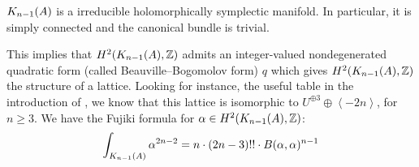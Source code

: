 \begin{theorem}\cite[Th\'eor\`eme 4]{Beauville}
$\kum{A}{n-1}$ is a irreducible holomorphically symplectic manifold. In particular, it is simply connected and the canonical bundle is trivial.
\end{theorem}
This implies that $H^2(\kum{A}{n-1},\Z)$ admits an integer-valued nondegenerated quadratic form (called Beauville--Bogomolov form) $q$ which gives $H^2(\kum{A}{n-1},\Z)$ the structure of a lattice. Looking for instance, the useful table in the introduction of \cite{Rapagnetta}, we know that this lattice is
isomorphic to $U^{\oplus 3}\oplus \left< -2n \right>$, for $n\geq 3$. 
We have the Fujiki formula for $\alpha\in H^2(\kum{A}{n-1},\Z)$:
\begin{equation} \label{fujiki}
\int_{\kum{A}{n-1}} \alpha^{2n-2} = n\cdot(2n-3)!!\cdot B(\alpha,\alpha)^{n-1}
\end{equation}

